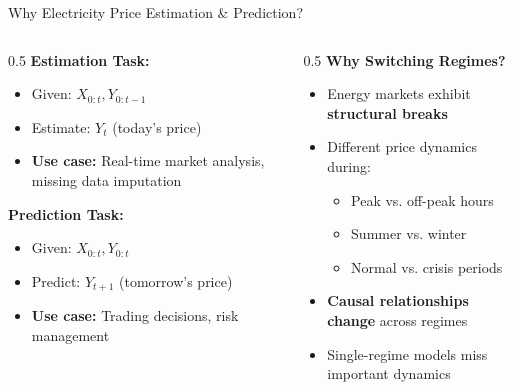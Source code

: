 \documentclass[aspectratio=169]{beamer}
\begin{document}
\begin{frame}{Why Electricity Price Estimation \& Prediction?}
\begin{columns}
\begin{column}{0.5\textwidth}
\textbf{Estimation Task:}
\begin{itemize}
    \item Given: $X_{0:t}, Y_{0:t-1}$
    \item Estimate: $Y_t$ (today's price)
    \item \textbf{Use case:} Real-time market analysis, missing data imputation
\end{itemize}

\vspace{0.3cm}
\textbf{Prediction Task:}
\begin{itemize}
    \item Given: $X_{0:t}, Y_{0:t}$
    \item Predict: $Y_{t+1}$ (tomorrow's price)
    \item \textbf{Use case:} Trading decisions, risk management
\end{itemize}
\end{column}

\begin{column}{0.5\textwidth}
\textbf{Why Switching Regimes?}
\begin{itemize}
    \item Energy markets exhibit \textbf{structural breaks}
    \item Different price dynamics during:
    \begin{itemize}
        \item Peak vs. off-peak hours
        \item Summer vs. winter
        \item Normal vs. crisis periods
    \end{itemize}
    \item \textbf{Causal relationships change} across regimes
    \item Single-regime models miss important dynamics
\end{itemize}
\end{column}
\end{columns}

\vspace{0.3cm}
\begin{center}
\end{center}
\end{frame}
\end{document}

